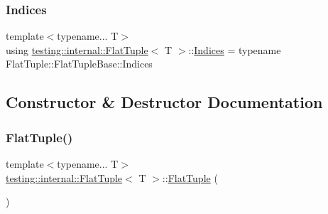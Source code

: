\subsubsection{\texorpdfstring{Indices}{Indices}}
{\footnotesize\ttfamily template$<$typename... T$>$ \\
using \hyperlink{classtesting_1_1internal_1_1FlatTuple}{testing\+::internal\+::\+Flat\+Tuple}$<$ T $>$\+::\hyperlink{classtesting_1_1internal_1_1FlatTuple_a004b42fc11ac1a85a9b1560fa83cdf77}{Indices} =  typename Flat\+Tuple\+::\+Flat\+Tuple\+Base\+::\+Indices\hspace{0.3cm}{\ttfamily [private]}}



\subsection{Constructor \& Destructor Documentation}
\mbox{\label{classtesting_1_1internal_1_1FlatTuple_a056c58b5dd85f470ec5db1db9956c702}} 
\subsubsection{\texorpdfstring{Flat\+Tuple()}{FlatTuple()}\hspace{0.1cm}{\footnotesize\ttfamily [1/2]}}
{\footnotesize\ttfamily template$<$typename... T$>$ \\
\hyperlink{classtesting_1_1internal_1_1FlatTuple}{testing\+::internal\+::\+Flat\+Tuple}$<$ T $>$\+::\hyperlink{classtesting_1_1internal_1_1FlatTuple}{Flat\+Tuple} (\begin{DoxyParamCaption}{ }\end{DoxyParamCaption})\hspace{0.3cm}{\ttfamily [default]}}

\mbox{\label{classtesting_1_1internal_1_1FlatTuple_a611d01b9ff2437e4b9cfe3bbedc6d6ae}} 
